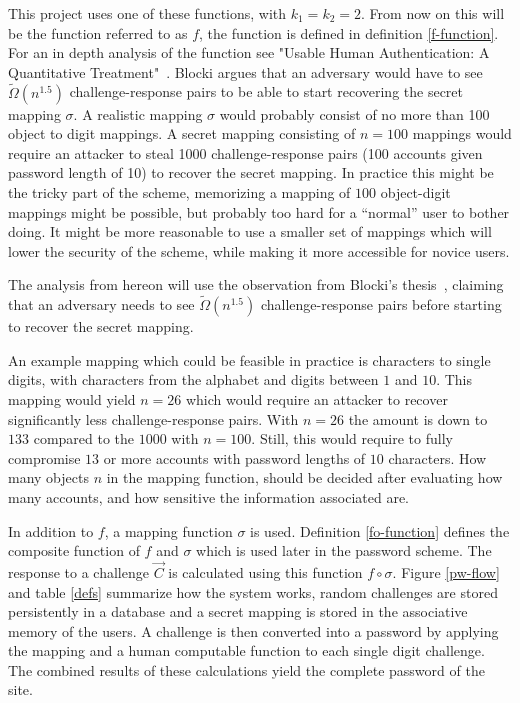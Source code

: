 \par This project uses one of these functions, with $k_1=k_2=2$. From now on this will be the function referred to as $f$, the function is defined in definition \ref{f-function}. For an in depth analysis of the function see "Usable Human Authentication: A Quantitative Treatment"~\cite{Blocki2014}. Blocki argues that an adversary would have to see $\tilde \Omega(n^{1.5})$ challenge-response pairs to be able to start recovering the secret mapping $\sigma$. A realistic mapping $\sigma$ would probably consist of no more than 100 object to digit mappings. A secret mapping consisting of $n=100$ mappings would require an attacker to steal 1000 challenge-response pairs (100 accounts given password length of 10) to recover the secret mapping. In practice this might be the tricky part of the scheme, memorizing a mapping of $100$ object-digit mappings might be possible, but probably too hard for a ``normal'' user to bother doing. It might be more reasonable to use a smaller set of mappings which will lower the security of the scheme, while making it more accessible for novice users. 
\begin{remark}\label{startrecover}
    The analysis from hereon will use the observation from Blocki's thesis~\cite{Blocki2014}, claiming that an adversary needs to see $\tilde \Omega(n^{1.5})$ challenge-response pairs before starting to recover the secret mapping.
\end{remark}
\par An example mapping which could be feasible in practice is characters to single digits, with characters from the alphabet and digits between $1$ and $10$. This mapping would yield $n=26$ which would require an attacker to recover significantly less challenge-response pairs. With $n=26$ the amount is down to $133$ compared to the $1000$ with $n=100$. Still, this would require to fully compromise $13$ or more accounts with password lengths of $10$ characters. How many objects $n$ in the mapping function, should be decided after evaluating how many accounts, and how sensitive the information associated are.
\par In addition to $f$, a mapping function $\sigma$ is used. Definition \ref{fo-function} defines the composite function of $f$ and $\sigma$ which is used later in the password scheme. The response to a challenge $\vec C$ is calculated using this function $f \circ \sigma$. Figure \ref{pw-flow} and table \ref{defs} summarize how the system works, random challenges are stored persistently in a database and a secret mapping is stored in the associative memory of the users. A challenge is then converted into a password by applying the mapping and a human computable function to each single digit challenge. The combined results of these calculations yield the complete password of the site.



